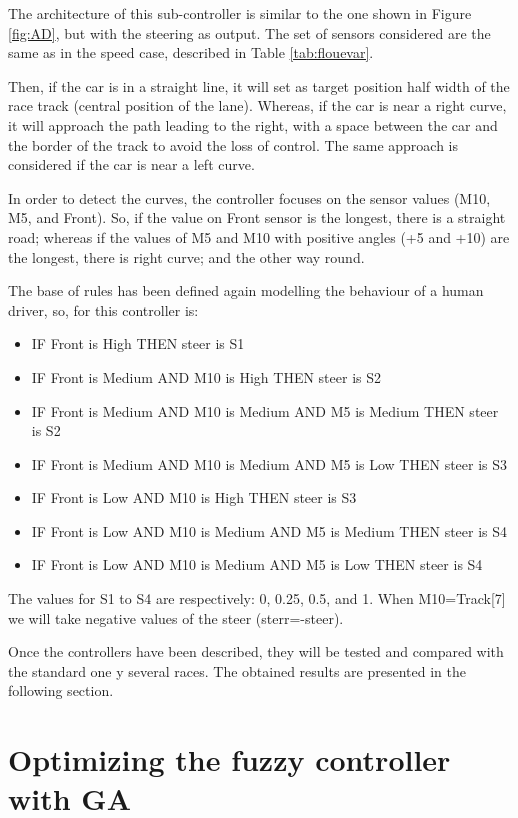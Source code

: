 \documentclass[runningheads,a4paper]{llncs}
\begin{document}
	The architecture of this sub-controller is similar to the one shown in Figure \ref{fig:AD}, but with the steering as output. The set of sensors considered are the same as in the speed case, described in Table \ref{tab:flouevar}.
	
	Then, if the car is in a straight line, it will set as target position half width of the race track (central position of the lane).	Whereas, if the car is near a right curve, it will approach the path leading to the right, with a space between the car and the border of the track to avoid the loss of control. The same approach is considered if the car is near a left curve.
	
	In order to detect the curves, the controller focuses on the sensor values (M10, M5, and Front). So, if the value on Front sensor is the longest, there is a straight road; whereas if the values of M5 and M10 with positive angles (+5 and +10) are the longest, there is right curve; and the other way round.
	
	The base of rules has been defined again modelling the behaviour of a human driver, so, for this controller is:
	
	\begin{itemize}		
		\item IF Front is High THEN steer is S1
		\item IF Front is Medium AND M10 is High THEN  steer is S2
		\item IF Front is Medium AND M10 is Medium AND M5 is Medium THEN steer is S2
		\item IF Front is Medium AND M10 is Medium AND M5 is Low THEN steer is S3
		\item IF Front is Low AND M10 is High THEN steer is S3
		\item IF Front is Low AND M10 is Medium AND M5 is Medium THEN steer is S4
		\item IF Front is Low AND M10 is Medium AND M5 is Low THEN steer is S4
	\end{itemize}	
	
	The values for S1 to S4 are respectively: 0, 0.25, 0.5, and 1.
	When M10=Track[7] we will take negative values of the steer (sterr=-steer).
	
	Once the controllers have been described, they will be tested and compared with the standard one y several races. The obtained results are presented in the following section.
	
	
\section{Optimizing the fuzzy controller with GA}
\end{document}
